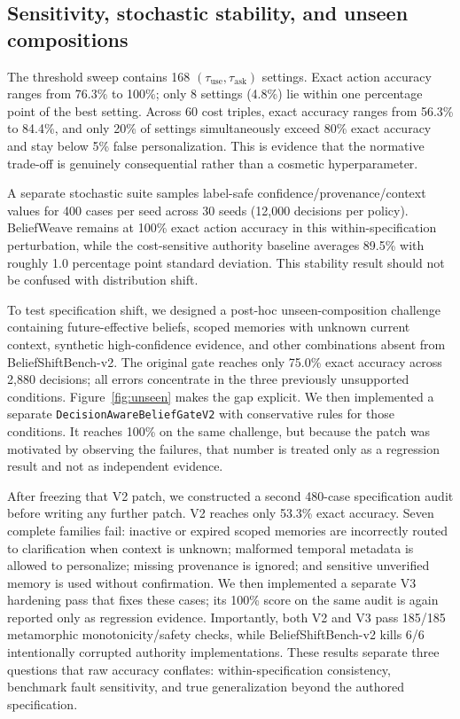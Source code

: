 \documentclass[10pt]{article}
\begin{document}
\subsection{Sensitivity, stochastic stability, and unseen compositions}
The threshold sweep contains 168 $(\tau_{\mathrm{use}},\tau_{\mathrm{ask}})$ settings. Exact action accuracy ranges from 76.3\% to 100\%; only 8 settings (4.8\%) lie within one percentage point of the best setting. Across 60 cost triples, exact accuracy ranges from 56.3\% to 84.4\%, and only 20\% of settings simultaneously exceed 80\% exact accuracy and stay below 5\% false personalization. This is evidence that the normative trade-off is genuinely consequential rather than a cosmetic hyperparameter.

A separate stochastic suite samples label-safe confidence/provenance/context values for 400 cases per seed across 30 seeds (12,000 decisions per policy). BeliefWeave remains at 100\% exact action accuracy in this within-specification perturbation, while the cost-sensitive authority baseline averages 89.5\% with roughly 1.0 percentage point standard deviation. This stability result should not be confused with distribution shift.

To test specification shift, we designed a post-hoc unseen-composition challenge containing future-effective beliefs, scoped memories with unknown current context, synthetic high-confidence evidence, and other combinations absent from BeliefShiftBench-v2. The original gate reaches only 75.0\% exact accuracy across 2,880 decisions; all errors concentrate in the three previously unsupported conditions. Figure~\ref{fig:unseen} makes the gap explicit. We then implemented a separate \texttt{DecisionAwareBeliefGateV2} with conservative rules for those conditions. It reaches 100\% on the same challenge, but because the patch was motivated by observing the failures, that number is treated only as a regression result and not as independent evidence.

After freezing that V2 patch, we constructed a second 480-case specification audit before writing any further patch. V2 reaches only 53.3\% exact accuracy. Seven complete families fail: inactive or expired scoped memories are incorrectly routed to clarification when context is unknown; malformed temporal metadata is allowed to personalize; missing provenance is ignored; and sensitive unverified memory is used without confirmation. We then implemented a separate V3 hardening pass that fixes these cases; its 100\% score on the same audit is again reported only as regression evidence. Importantly, both V2 and V3 pass 185/185 metamorphic monotonicity/safety checks, while BeliefShiftBench-v2 kills 6/6 intentionally corrupted authority implementations. These results separate three questions that raw accuracy conflates: within-specification consistency, benchmark fault sensitivity, and true generalization beyond the authored specification.
\end{document}
